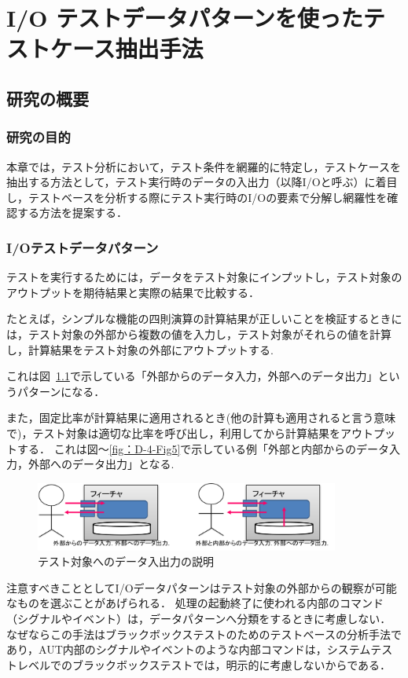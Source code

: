 % 
\chapter{I/O テストデータパターンを使ったテストケース抽出手法}\label{chap:4}
\section{研究の概要} \label{sec:4-1}
\subsection{研究の目的} \label{sec:4-1-1}
本章では，テスト分析において，テスト条件を網羅的に特定し，テストケースを抽出する方法として，テスト実行時のデータの入出力（以降I/Oと呼ぶ）に着目し，テストベースを分析する際にテスト実行時のI/Oの要素で分解し網羅性を確認する方法を提案する．

\subsection{I/Oテストデータパターン} \label{sec:4-1-1}
テストを実行するためには，データをテスト対象にインプットし，テスト対象のアウトプットを期待結果と実際の結果で比較する．

たとえば，シンプルな機能の四則演算の計算結果が正しいことを検証するときには，テスト対象の外部から複数の値を入力し，テスト対象がそれらの値を計算し，計算結果をテスト対象の外部にアウトプットする.

これは図~\ref{fig:D-3-Fig4}で示している「外部からのデータ入力，外部へのデータ出力」というパターンになる．

また，固定比率が計算結果に適用されるとき(他の計算も適用されると言う意味で)，テスト対象は適切な比率を呼び出し，利用してから計算結果をアウトプットする．
これは図〜\ref{fig：D-4-Fig5}で示している例「外部と内部からのデータ入力，外部へのデータ出力」となる.
\begin{figure}[htbp]
 \begin{center}
 \includegraphics[width=10cm]{./image/D-3-Fig4.png}
 \caption{テスト対象へのデータ入出力の説明}
 \label{fig:D-3-Fig4}
 \end{center}
\end{figure}
注意すべきこととしてI/Oデータパターンはテスト対象の外部からの観察が可能なものを選ぶことがあげられる．
処理の起動終了に使われる内部のコマンド（シグナルやイベント）は，データパターンへ分類をするときに考慮しない．
なぜならこの手法はブラックボックステストのためのテストベースの分析手法であり，AUT内部のシグナルやイベントのような内部コマンドは，システムテストレベルでのブラックボックステストでは，明示的に考慮しないからである．


